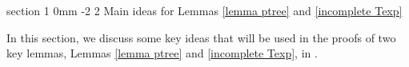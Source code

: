 \documentclass{article}
\makeatletter
\newcommand{\1}{\mathds{1}}
\numberwithin{equation}{section}
\theoremstyle{plain} %
\theoremstyle{remark}
\renewcommand{\section}{\@startsection
{section}%
{1}%
{0mm}%
{-2\baselineskip}%
{2\baselineskip}%
{\normalfont\large\scshape\centering}} %
\makeatother
\begin{document}
\section{Main ideas for Lemmas \ref{lemma ptree} and \ref{incomplete Texp}}\label{sec strategy} 
%
%
%
%
%
%
 
 In this section, we discuss some key ideas that will be used in the proofs of two key lemmas, Lemmas \ref{lemma ptree} and \ref{incomplete Texp}, in \cite{PartII_high}. %
 

\medskip
\end{document}
